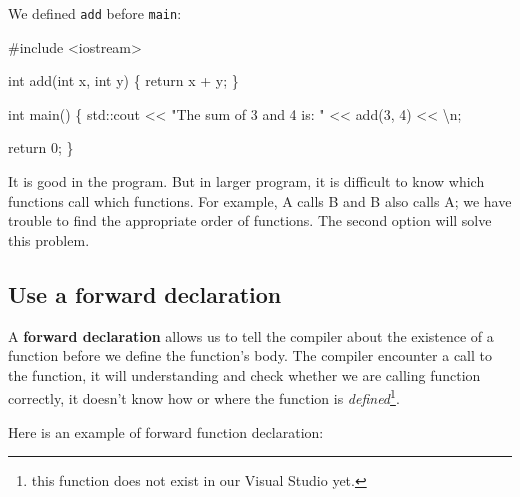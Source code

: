 \documentclass[
  letterpaper,
  DIV=11,
  numbers=noendperiod]{scrreprt}
\newenvironment{Shaded}{\begin{snugshade}}{\end{snugshade}}
\newcommand{\CommentTok}[1]{\textcolor[rgb]{0.37,0.37,0.37}{#1}}
\newcommand{\DecValTok}[1]{\textcolor[rgb]{0.68,0.00,0.00}{#1}}
\newcommand{\ErrorTok}[1]{\textcolor[rgb]{0.68,0.00,0.00}{#1}}
\newcommand{\FunctionTok}[1]{\textcolor[rgb]{0.28,0.35,0.67}{#1}}
\newcommand{\NormalTok}[1]{\textcolor[rgb]{0.00,0.23,0.31}{#1}}
\newcommand{\SpecialCharTok}[1]{\textcolor[rgb]{0.37,0.37,0.37}{#1}}
\newcommand{\StringTok}[1]{\textcolor[rgb]{0.13,0.47,0.30}{#1}}
\begin{document}
We defined \texttt{add} before \texttt{main}:

\begin{Shaded}
\begin{Highlighting}[]
\CommentTok{\#include \textless{}iostream\textgreater{}}

\NormalTok{int }\FunctionTok{add}\NormalTok{(int x, int y)}
\NormalTok{\{}
\NormalTok{    return x }\SpecialCharTok{+}\NormalTok{ y;}
\NormalTok{\}}

\NormalTok{int }\FunctionTok{main}\NormalTok{()}
\NormalTok{\{}
\NormalTok{    std}\SpecialCharTok{::}\NormalTok{cout }\SpecialCharTok{\textless{}}\ErrorTok{\textless{}} \StringTok{"The sum of 3 and 4 is: "} \SpecialCharTok{\textless{}}\ErrorTok{\textless{}} \FunctionTok{add}\NormalTok{(}\DecValTok{3}\NormalTok{, }\DecValTok{4}\NormalTok{) }\SpecialCharTok{\textless{}}\ErrorTok{\textless{}} \StringTok{\textquotesingle{}}\SpecialCharTok{\textbackslash{}n}\StringTok{\textquotesingle{}}\NormalTok{;}

\NormalTok{    return }\DecValTok{0}\NormalTok{;}
\NormalTok{\}}
\end{Highlighting}
\end{Shaded}

It is good in the program. But in larger program, it is difficult to
know which functions call which functions. For example, A calls B and B
also calls A; we have trouble to find the appropriate order of
functions. The second option will solve this problem.

\hypertarget{use-a-forward-declaration}{%
\subsection{Use a forward declaration}\label{use-a-forward-declaration}}

A \textbf{forward declaration} allows us to tell the compiler about the
existence of a function before we define the function's body. The
compiler encounter a call to the function, it will understanding and
check whether we are calling function correctly, it doesn't know how or
where the function is \emph{defined}\footnote{this function does not
  exist in our Visual Studio yet.}.

Here is an example of forward function declaration:
\end{document}
